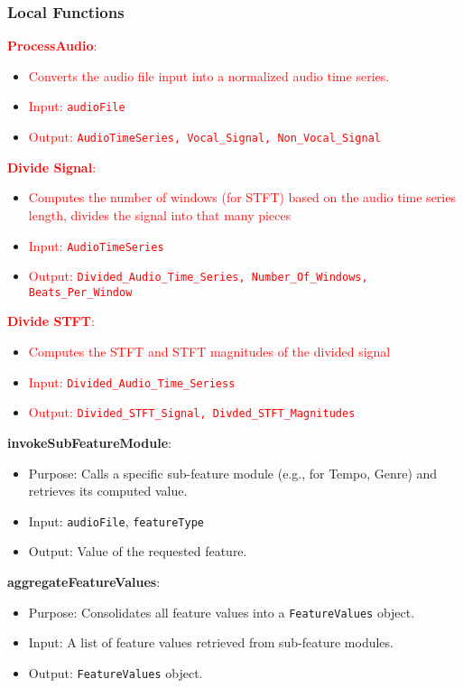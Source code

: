 \documentclass[12pt, titlepage]{article}
\begin{document}
\subsubsection{Local Functions}

\textcolor{red}{\textbf{ProcessAudio}:}
\begin{itemize}
    \item \textcolor{red}{Converts the audio file input into a normalized audio time series.}
    \item \textcolor{red}{Input: \texttt{audioFile}}
    \item \textcolor{red}{Output: \texttt{AudioTimeSeries, Vocal\_Signal, Non\_Vocal\_Signal}}
\end{itemize}

\textcolor{red}{\textbf{Divide Signal}:}
\begin{itemize}
    \item \textcolor{red}{Computes the number of windows (for STFT) based on the audio time series length, divides the signal into that many pieces}
    \item \textcolor{red}{Input: \texttt{AudioTimeSeries}}
    \item \textcolor{red}{Output: \texttt{Divided\_Audio\_Time\_Series, Number\_Of\_Windows, Beats\_Per\_Window}}
\end{itemize}

\textcolor{red}{\textbf{Divide STFT}:}
\begin{itemize}
    \item \textcolor{red}{Computes the STFT and STFT magnitudes of the divided signal}
    \item \textcolor{red}{Input:  \texttt{Divided\_Audio\_Time\_Seriess}}
    \item \textcolor{red}{Output: \texttt{Divided\_STFT\_Signal, Divded\_STFT\_Magnitudes}}
\end{itemize}

\textbf{invokeSubFeatureModule}:
\begin{itemize}
    \item Purpose: Calls a specific sub-feature module (e.g., for Tempo, Genre) and retrieves its computed value.
    \item Input: \texttt{audioFile}, \texttt{featureType}
    \item Output: Value of the requested feature.
\end{itemize}

\textbf{aggregateFeatureValues}:
\begin{itemize}
    \item Purpose: Consolidates all feature values into a \texttt{FeatureValues} object.
    \item Input: A list of feature values retrieved from sub-feature modules.
    \item Output: \texttt{FeatureValues} object.
\end{itemize}
\end{document}
